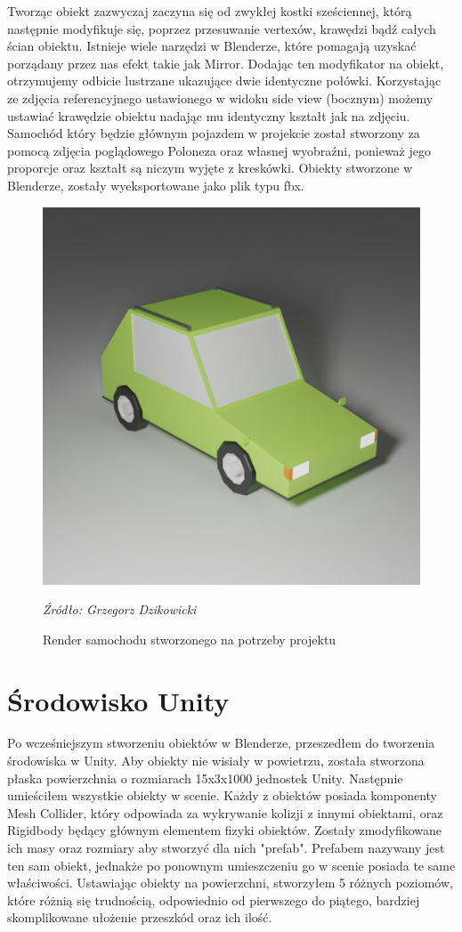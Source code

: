 \indent Tworząc obiekt zazwyczaj zaczyna się od zwykłej kostki sześciennej, którą następnie modyfikuje się, poprzez przesuwanie vertexów, krawędzi bądź całych ścian obiektu. Istnieje wiele narzędzi w Blenderze, które pomagają uzyskać porządany przez nas efekt takie jak Mirror. Dodając ten modyfikator na obiekt, otrzymujemy odbicie lustrzane ukazujące dwie identyczne połówki. Korzystając ze zdjęcia referencyjnego ustawionego w widoku side view (bocznym) możemy ustawiać krawędzie obiektu nadając mu identyczny kształt jak na zdjęciu. Samochód który będzie głównym pojazdem w projekcie został stworzony za pomocą zdjęcia poglądowego Poloneza oraz własnej wyobraźni, ponieważ jego proporcje oraz kształt są niczym wyjęte z kreskówki. Obiekty stworzone w Blenderze, zostały wyeksportowane jako plik typu fbx.

\begin{figure}[!h]
\centering
  \includegraphics[width=0.5\linewidth]{carblend.png}
  \caption{Render samochodu stworzonego na potrzeby projektu}\label{rys_2}
  \begin{minipage}[t]{0.5\linewidth}
    \emph{Źródło: Grzegorz Dzikowicki}
  \end{minipage}
\end{figure}


\section{Środowisko Unity}
\indent Po wcześniejszym stworzeniu obiektów w Blenderze, przeszedłem do tworzenia środowiska w Unity. Aby obiekty nie wisiały w powietrzu, została stworzona płaska powierzchnia o rozmiarach 15x3x1000 jednostek Unity. Następnie umieściłem wszystkie obiekty w scenie. Każdy z obiektów posiada komponenty Mesh Collider, który odpowiada za wykrywanie kolizji z innymi obiektami, oraz Rigidbody będący głównym elementem fizyki obiektów.  Zostały zmodyfikowane ich masy oraz rozmiary aby stworzyć dla nich "prefab". Prefabem nazywany jest ten sam obiekt, jednakże po ponownym umieszczeniu go w scenie posiada te same właściwości. Ustawiając obiekty na powierzchni, stworzyłem 5 różnych poziomów, które różnią się trudnością, odpowiednio od pierwszego do piątego, bardziej skomplikowane ułożenie przeszkód oraz ich ilość. 

